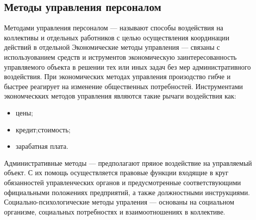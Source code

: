 \documentclass[a4paper,12pt,oneside,final]{extarticle}
\numberwithin{equation}{section}
\begin{document}
\subsection{Методы управления персоналом}
Методами управления персоналом --- называют способы воздействия на коллективы и отдельных работников с целью осуществления координации действий в отдельной 
Экономические методы управления --- связаны с используованием средств и иструментов экономическую заинтересованность управляемого объекта в решении тех или иных задач без мер административного воздействия. 
При экономических методах управления произодство гибче и быстрее реагирует на изменение общественных потребностей. 
Инструментами экономческких методов управления являются такие рычаги воздействия как: 
\begin{itemize}
	\item цены;
	\item кредит;стоимость;
	\item зарабатная плата.
\end{itemize}
Административные методы --- предполагают пряиое воздействие на управляемый объект. 
С их помощь осуществляется правовые функции входящие в круг обязанностей управленческих органов и предусмотренные соответствующими официальными положениях предприятий, а также должностными инструкциями.
Социально-психологические методы упраления --- основаны на социальном организме, социальных потребностях и взаимоотношениях в коллективе. 
\end{document}
